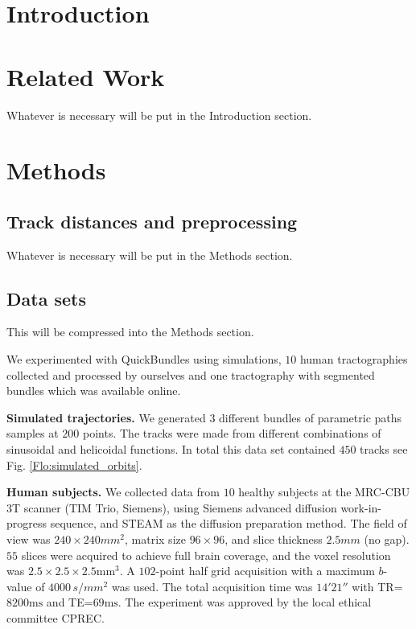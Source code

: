 \documentclass[preprint,authoryear,a4paper,10pt,onecolumn]{elsarticle}
\begin{document}
\section{Introduction}



\section{Related Work}

Whatever is necessary will be put in the Introduction section.

\section{Methods}

\subsection{\label{sub:track-distances}Track distances and preprocessing}

Whatever is necessary will be put in the Methods section.

\subsection{Data sets\label{sub:QB-Data-sets}}

This will be compressed into the Methods section.

We experimented with QuickBundles using simulations, $10$ human
tractographies collected and processed by ourselves and one tractography
with segmented bundles which was available online.

\textbf{Simulated trajectories.} We generated $3$ different bundles of
parametric paths samples at $200$ points. The tracks were made from
different combinations of sinusoidal and helicoidal functions.  In total
this data set contained $450$ tracks see Fig. \ref{Flo:simulated_orbits}.

\textbf{Human subjects. }We collected data from $10$ healthy subjects at
the MRC-CBU 3T scanner (TIM Trio, Siemens), using Siemens advanced
diffusion work-in-progress sequence, and STEAM
\cite{merboldt1992diffusion,MAB04} as the diffusion preparation
method. The field of view was $240\times240mm^{2}$, matrix size
$96\times96$, and slice thickness $2.5mm$ (no gap).  $55$ slices were
acquired to achieve full brain coverage, and the voxel resolution was
$2.5\times2.5\times2.5\textrm{mm}{}^{3}$. A $102$-point half grid
acquisition\cite{Yeh2010} with a maximum $b$-value of $4000\, s/mm^{2}$
was used. The total acquisition time was $14'21''$ with
TR=$8200\textrm{ms}$ and TE=$69\textrm{ms}$. The experiment was approved
by the local ethical committee CPREC.
\end{document}
